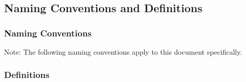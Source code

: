 \documentclass [11pt]{article}
\begin{document}
\subsection{Naming Conventions and Definitions}

\subsubsection{Naming Conventions}
Note: The following naming conventions apply to this document specifically. 
%
%
%
%
%
%
%

\subsubsection{Definitions}

\end{document}

